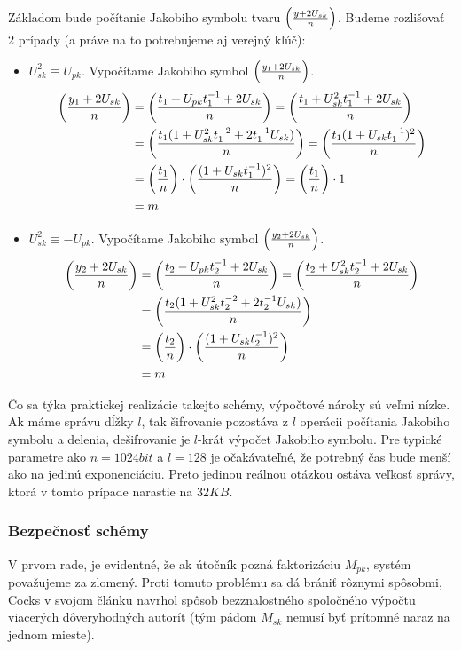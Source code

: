 Základom bude počítanie Jakobiho symbolu tvaru $\left( \frac{y +2 U_{sk}}{n} \right)$.
Budeme rozlišovať 2 prípady (a práve na to potrebujeme aj verejný kľúč):
\begin{itemize}
    \item $U_{sk}^2 \equiv U_{pk}$.
        Vypočítame Jakobiho symbol $\left( \frac{y_1 + 2U_{sk}}{n} \right)$.
        \begin{align*}
            \left( \frac{y_1 + 2U_{sk}}{n} \right) &=
            \left( \frac{t_1 + U_{pk} t_1^{-1} + 2 U_{sk}}{n} \right) =
            \left( \frac{t_1 + U_{sk}^2 t_1^{-1} + 2 U_{sk}}{n} \right) \\
            &=
            \left( \frac{t_1(1 + U_{sk}^2 t_1^{-2} + 2 t_1^{-1} U_{sk})}{n} \right) =
            \left( \frac{t_1(1+U_{sk}t_1^{-1})^2}{n} \right)  \\
            &=
            \left( \frac{t_1}{n} \right) \cdot \left( \frac{(1+U_{sk}t_1^{-1})^2}{n} \right)=
            \left( \frac{t_1}{n} \right) \cdot 1 \\
            &= m
        \end{align*}

    \item $U_{sk}^2 \equiv -U_{pk}$.
        Vypočítame Jakobiho symbol $\left( \frac{y_2 + 2U_{sk}}{n} \right)$.
        \begin{align*}
            \left( \frac{y_2 + 2U_{sk}}{n} \right) &=
            \left( \frac{t_2 - U_{pk} t_2^{-1} + 2 U_{sk}}{n} \right) =
            \left( \frac{t_2 + U_{sk}^2 t_2^{-1} + 2 U_{sk}}{n} \right) \\
            &=
            \left( \frac{t_2(1 + U_{sk}^2 t_2^{-2} + 2 t_2^{-1} U_{sk})}{n} \right)
            \\
            &=
            \left( \frac{t_2}{n} \right) \cdot \left( \frac{(1+U_{sk}t_2^{-1})^2}{n} \right) \\
            &= m
        \end{align*}
\end{itemize}

Čo sa týka praktickej realizácie takejto schémy, výpočtové nároky sú
veľmi nízke. Ak máme správu dĺžky $l$, tak
šifrovanie pozostáva z $l$ operácii počítania Jakobiho
symbolu a delenia, dešifrovanie je $l$-krát výpočet Jakobiho symbolu.
Pre typické parametre ako $n=1024bit$ a $l=128$ je očakávateľné, že
potrebný čas bude menší ako na jedinú exponenciáciu. Preto jedinou
reálnou otázkou ostáva veľkosť správy, ktorá v tomto prípade narastie
na $32KB$.

\subsubsection{Bezpečnosť schémy}
V prvom rade, je evidentné, že ak útočník pozná faktorizáciu $M_{pk}$,
systém považujeme za zlomený. Proti tomuto problému sa dá brániť
rôznymi spôsobmi, Cocks v svojom článku navrhol spôsob bezznalostného
spoločného výpočtu viacerých dôveryhodných autorít (tým pádom $M_{sk}$
nemusí byť prítomné naraz na jednom mieste).

